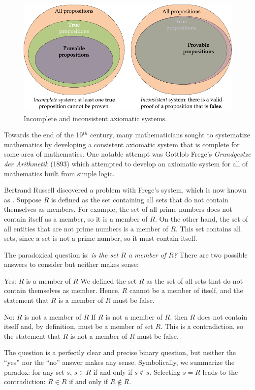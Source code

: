 \begin{schemeregion}
\begin{figure}[!bth]
\begin{center}
\includegraphics[width=4.8in]{figures/axiomaticsystems.pdf}
\caption{Incomplete and inconsistent axiomatic systems.}\label{fig:axiomatic-systems}
\end{center}
\end{figure}

 Towards the end of the 19$^{th}$ century, many mathematicians sought to systematize mathematics by developing a consistent axiomatic system that is complete for some area of mathematics.  One notable attempt was Gottlob Frege's \emph{Grundgestze der Arithmetik} (1893) which attempted to develop an axiomatic system for all of mathematics built from simple logic.

Bertrand Russell discovered a problem with Frege's system, which is now known as .  Suppose $R$ is defined as the set containing all sets that do not contain themselves as members.  For example, the set of all prime numbers does not contain itself as a member, so it is a member of $R$.  On the other hand, the set of all entities that are not prime numbers is a member of $R$.  This set contains all sets, since a set is not a prime number, so it must contain itself.  

The paradoxical question is: \emph{is the set $R$ a member of $R$?}  There are two possible answers to consider but neither makes sense:
\begin{descriptionlist}
\item[Yes: $R$ is a member of $R$]\forcenl
We defined the set $R$ as the set of all sets that do not contain themselves as member.  Hence, $R$ cannot be a member of itself, and the statement that $R$ is a member of $R$ must be false.
\item[No: $R$ is not a member of $R$]\forcenl
If $R$ is not a member of $R$, then $R$ does not contain itself and, by definition, must be a member of set $R$.  This is a contradiction, so the statement that $R$ is not a member of $R$ must be false.
\end{descriptionlist}
The question is a perfectly clear and precise binary question, but neither the ``yes'' nor the ``no'' answer makes any sense.  Symbolically, we summarize the paradox: for any set $s$, $s \in R$ if and only if $s \notin s$.  Selecting $s = R$ leads to the contradiction: $R \in R$ if and only if $R \notin R$.


\end{schemeregion}
